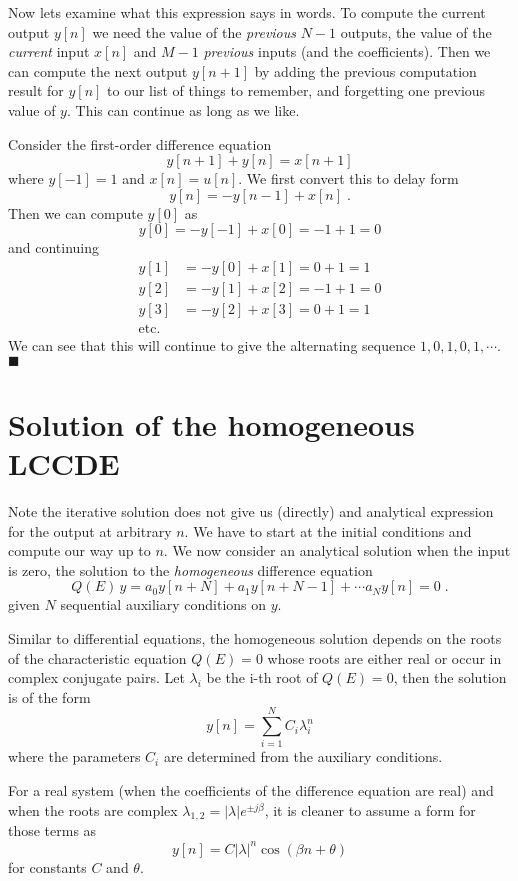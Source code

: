 Now lets examine what this expression says in words. To compute the current output $y[n]$ we need the value of the \emph{previous} $N-1$ outputs, the value of the \emph{current} input $x[n]$ and $M-1$ \emph{previous} inputs (and the coefficients). Then we can compute the next output $y[n+1]$ by adding the previous computation result for $y[n]$ to our list of things to remember, and forgetting one previous value of $y$. This can continue as long as we like.

\begin{example}
  Consider the first-order difference equation
  \[
  y[n+1] + y[n] = x[n+1]
  \]
  where $y[-1] = 1$ and $x[n] = u[n]$. We first convert this to delay form
  \[
  y[n] = -y[n-1] + x[n]\; .
  \]
  Then we can compute $y[0]$ as
  \[
  y[0] = -y[-1] + x[0] = -1 + 1 = 0
  \]
  and continuing
  \begin{align*}
  y[1] &= -y[0] + x[1] = 0 + 1 = 1\\
  y[2] &= -y[1] + x[2] = -1 + 1 = 0\\
  y[3] &= -y[2] + x[3] = 0 + 1 = 1\\
  \mbox{etc.}
  \end{align*}
  We can see that this will continue to give the alternating sequence $1,0,1,0,1,\cdots$.
$\blacksquare$
\end{example}

\section{Solution of the homogeneous LCCDE}

Note the iterative solution does not give us (directly) and analytical expression for the output at arbitrary $n$. We have to start at the initial conditions and compute our way up to $n$. We now consider an analytical solution when the input is zero, the solution to the \emph{homogeneous} difference equation
\[
Q(E)\, y = a_0y[n+N] + a_1y[n+N-1] + \cdots a_N y[n] = 0 \; .
\]
given $N$ sequential auxiliary conditions on $y$.

Similar to differential equations, the homogeneous solution depends on the roots of the characteristic equation $Q(E)=0$ whose roots are either real or occur in complex conjugate pairs. Let $\lambda_i$ be the i-th root of $Q(E) = 0$, then the solution is of the form
\[
y[n] = \sum\limits_{i=1}^N C_i \lambda_i^{n}
\]
where the parameters $C_i$ are determined from the auxiliary conditions.

For a real system (when the coefficients of the difference equation are real) and when the roots are complex $\lambda_{1,2} = |\lambda|e^{\pm j\beta}$, it is cleaner to assume a form for those terms as
\[
y[n] = C |\lambda|^n\cos(\beta n + \theta)
\]
for constants $C$ and $\theta$.

